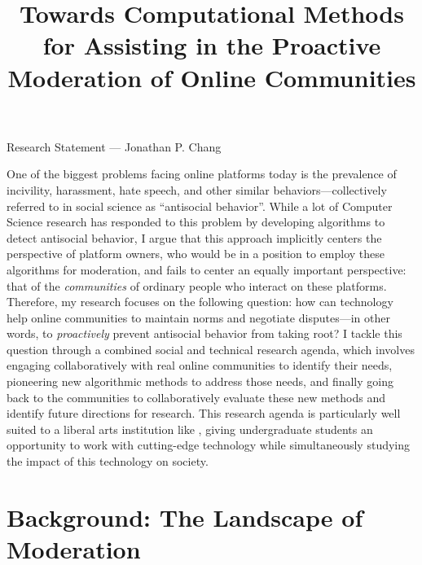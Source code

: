 \documentclass[11pt,letterpaper]{article}
\title{Towards Computational Methods for Assisting in the Proactive Moderation of Online Communities}
\begin{document}
\maketitle

\begin{center}
Research Statement --- Jonathan P. Chang
\end{center}

One of the biggest problems facing online platforms today is the prevalence of incivility, harassment, hate speech, and other similar behaviors---collectively referred to in social science as ``antisocial behavior''.
While a lot of Computer Science research has responded to this problem by developing algorithms to detect antisocial behavior, I argue that this approach implicitly centers the perspective of platform owners, who would be in a position to employ these algorithms for moderation, and fails to center an equally important perspective: that of the \emph{communities} of ordinary people who interact on these platforms.
Therefore, my research focuses on the following question: how can technology help online communities to maintain norms and negotiate disputes---in other words, to \emph{proactively} prevent antisocial behavior from taking root?
I tackle this question through a combined social and technical research agenda, which involves engaging collaboratively with real online communities to identify their needs, pioneering new algorithmic methods to address those needs, and finally going back to the communities to collaboratively evaluate these new methods and identify future directions for research.
\ifliberalarts
This research agenda is particularly well suited to a liberal arts institution like \schoolname, giving undergraduate students an opportunity to work with cutting-edge technology while simultaneously studying the impact of this technology on society.
\else
%
\fi

\section{Background: The Landscape of Moderation}
\end{document}
